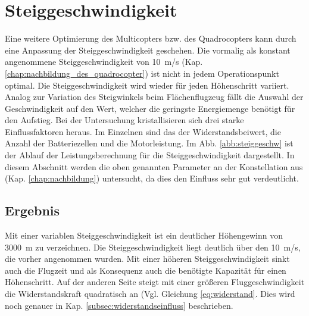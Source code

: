 
\newpage
\section{Steiggeschwindigkeit}
\label{sec:steiggeschwindigkeit}
Eine weitere Optimierung des Multicopters bzw. des Quadrocopters kann durch eine Anpassung der Steiggeschwindigkeit geschehen. Die vormalig als konstant angenommene Steiggeschwindigkeit von \SI{10}{m/s} (Kap. \ref{chap:nachbildung_des_quadrocopter}) ist nicht in jedem Operationspunkt optimal. Die Steiggeschwindigkeit wird wieder für jeden Höhenschritt variiert. Analog zur Variation des Steigwinkels beim Flächenflugzeug fällt die Auswahl der Geschwindigkeit auf den Wert, welcher die geringste Energiemenge benötigt für den Aufstieg. Bei der Untersuchung kristallisieren sich drei starke Einflussfaktoren heraus. Im Einzelnen sind das der Widerstandsbeiwert, die Anzahl der Batteriezellen und die Motorleistung. Im Abb. \ref{abb:steiggeschw} ist der Ablauf der Leistungsberechnung für die Steiggeschwindigkeit dargestellt. In diesem Abschnitt werden die oben genannten Parameter an der Konstellation aus (Kap. \ref{chap:nachbildung}) untersucht, da dies den Einfluss sehr gut verdeutlicht.


\subsection{Ergebnis}
Mit einer variablen Steiggeschwindigkeit ist ein deutlicher Höhengewinn von \SI{3000}{m} zu verzeichnen. Die Steiggeschwindigkeit liegt deutlich über den \SI{10}{m/s}, die vorher angenommen wurden. Mit einer höheren Steiggeschwindigkeit sinkt auch die Flugzeit und als Konsequenz auch die benötigte Kapazität für einen Höhenschritt. Auf der anderen Seite steigt mit einer größeren Fluggeschwindigkeit die Widerstandskraft quadratisch an (Vgl. Gleichung \ref{eq:widerstand}. Dies wird noch genauer in Kap. \ref{subsec:widerstandseinfluss} beschrieben. 

